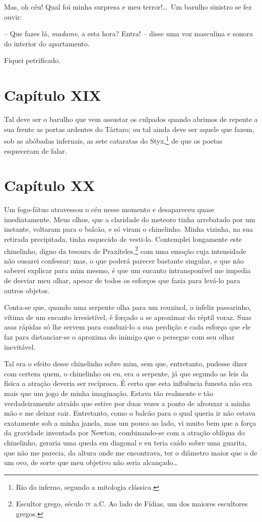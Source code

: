  Mas, oh céu! Qual foi minha surpresa e meu terror!\ldots\ Um barulho
sinistro se fez ouvir:

 -- Que fazes lá, \textit{madame}, a esta hora? Entra! -- disse uma voz
masculina e sonora do interior do apartamento.

 Fiquei petrificado.

\section*{Capítulo XIX}

 Tal deve ser o barulho que vem assustar os culpados quando abrimos de
repente a sua frente as portas ardentes do Tártaro; ou tal ainda deve
ser aquele que fazem, sob as abóbadas infernais, as sete cataratas do
Styx,\footnote{ Rio do inferno, segundo a mitologia clássica.} de
que os poetas esqueceram de falar.

\section*{Capítulo XX}

 Um fogo-fátuo atravessou o céu nesse momento e desapareceu quase
imediatamente. Meus olhos, que a claridade do meteoro tinha arrebatado
por um instante, voltaram para o balcão, e só viram o chinelinho. Minha
vizinha, na sua retirada precipitada, tinha esquecido de vesti-lo.
Contemplei longamente este chinelinho, digno da tesoura de
Praxíteles,\footnote{ Escultor grego, século \textsc{iv} a.C. Ao lado de Fídias,
um dos maiores escultores gregos.} com uma emoção cuja
intensidade não ousarei confessar; mas, o que poderá parecer bastante
singular, e que não saberei explicar para mim mesmo, é que um encanto
intransponível me impedia de desviar meu olhar, apesar de todos os
esforços que fazia para levá-lo para outros objetos. 

 Conta-se que, quando uma serpente olha para um rouxinol, o infeliz
passarinho, vítima de um encanto irresistível, é forçado a se aproximar
do réptil voraz. Suas asas rápidas só lhe servem para conduzi-lo a sua
perdição e cada esforço que ele faz para distanciar-se o aproxima do
inimigo que o persegue com seu olhar inevitável. 

 Tal era o efeito desse chinelinho sobre mim, sem que, entretanto,
pudesse dizer com certeza quem, o chinelinho ou eu, era a serpente, já
que segundo as leis da física a atração deveria ser recíproca. É certo
que esta influência funesta não era mais que um jogo de minha
imaginação. Estava tão realmente e tão verdadeiramente atraído que
estive por duas vezes a ponto de afrouxar a minha mão e me deixar cair.
Entretanto, como o balcão para o qual queria ir não estava exatamente
sob a minha janela, mas um pouco ao lado, vi muito bem que a força da
gravidade inventada por Newton, combinando-se com a atração oblíqua do
chinelinho, geraria uma queda em diagonal e eu teria caído sobre uma
guarita, que não me parecia, da altura onde me encontrava, ter o
diâmetro maior que o de um ovo, de sorte que meu objetivo não seria
alcançado\ldots

